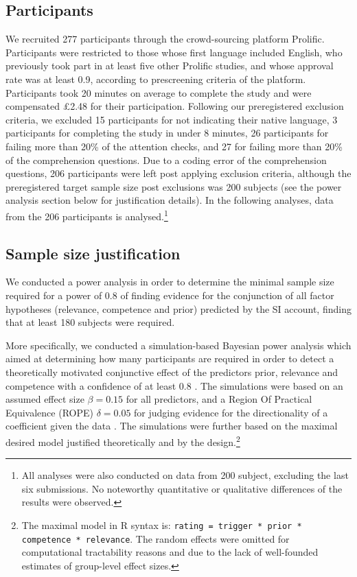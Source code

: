\documentclass{sp}
\newcommand{\mf}[1]{\textcolor{BurntOrange}{[MF: #1]}}
\begin{document}
\subsection{Participants}
We recruited 277 participants through the crowd-sourcing platform Prolific. Participants were restricted to those whose first language included English, who previously took part in at least five other Prolific studies, and whose approval rate was at least 0.9, according to prescreening criteria of the platform. Participants took 20 minutes on average to complete the study and were compensated \pounds2.48 for their participation. Following our preregistered exclusion criteria, we excluded 15 participants for not indicating their native language, 3 participants for completing the study in under 8 minutes, 26 participants for failing more than 20\% of the attention checks, and 27 for failing more than 20\% of the comprehension questions. Due to a coding error of the comprehension questions, 206 participants were left post applying exclusion criteria, although the preregistered target sample size post exclusions was 200 subjects (see the power analysis section below for justification details).
In the following analyses, data from the 206 participants is analysed.\footnote{All analyses were also conducted on data from 200 subject, excluding the last six submissions. No noteworthy quantitative or qualitative differences of the results were observed.}

\subsection{Sample size justification}
We conducted a power analysis in order to determine the minimal sample size required for a power of 0.8 of finding evidence for the conjunction of all factor hypotheses (relevance, competence and prior) predicted by the SI account, finding that at least 180 subjects were required. 

More specifically, we conducted a simulation-based Bayesian power analysis which aimed at determining how many participants are required in order to detect a theoretically motivated conjunctive effect of the predictors prior, relevance and competence with a confidence of at least 0.8 \citep[e.g.,][]{degen2015investigating}. The simulations were based on an assumed effect size $\beta = 0.15$ for all predictors, and a Region Of Practical Equivalence (ROPE) $\delta = 0.05$ for judging evidence for the directionality of a coefficient given the data \citep{kruschke2014doing}. The simulations were further based on the maximal desired model justified theoretically and by the design.\footnote{The maximal model in R syntax is: \texttt{rating = trigger * prior * competence * relevance}. The random effects were omitted for computational tractability reasons and due to the lack of well-founded estimates of group-level effect sizes.}
\end{document}
